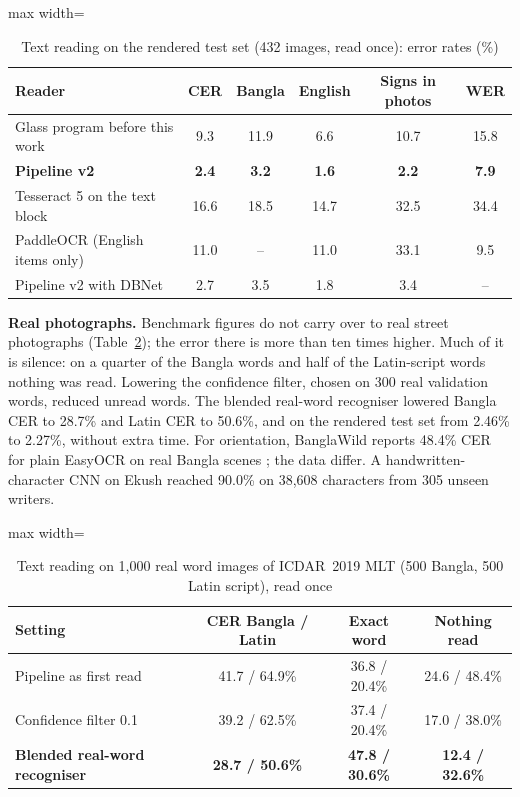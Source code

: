 \documentclass[preprint,12pt]{elsarticle}
\begin{document}
\begin{table}[!htbp]
\caption{Text reading on the rendered test set (432 images, read once): error rates (\%)}
\label{tab:ocr}
\centering\small
\begin{adjustbox}{max width=\textwidth}\begin{tabular}{@{}lccccc@{}}
\toprule
Reader & CER & Bangla & English & Signs in photos & WER \\ \midrule
Glass program before this work & 9.3 & 11.9 & 6.6 & 10.7 & 15.8 \\
\textbf{Pipeline v2} & \textbf{2.4} & \textbf{3.2} & \textbf{1.6} & \textbf{2.2} & \textbf{7.9} \\
Tesseract 5 on the text block & 16.6 & 18.5 & 14.7 & 32.5 & 34.4 \\
PaddleOCR (English items only) & 11.0 & -- & 11.0 & 33.1 & 9.5 \\
Pipeline v2 with DBNet & 2.7 & 3.5 & 1.8 & 3.4 & -- \\ \bottomrule
\end{tabular}\end{adjustbox}
\end{table}

\textbf{Real photographs.} Benchmark figures do not carry over to real street photographs (Table~\ref{tab:ocr_real}); the error there is more than ten times higher. Much of it is silence: on a quarter of the Bangla words and half of the Latin-script words nothing was read. Lowering the confidence filter, chosen on 300 real validation words, reduced unread words. The blended real-word recogniser lowered Bangla CER to 28.7\% and Latin CER to 50.6\%, and on the rendered test set from 2.46\% to 2.27\%, without extra time. For orientation, BanglaWild reports 48.4\% CER for plain EasyOCR on real Bangla scenes \cite{banglawild}; the data differ. A handwritten-character CNN on Ekush \cite{ekush} reached 90.0\% on 38,608 characters from 305 unseen writers.

\begin{table}[!htbp]
\caption{Text reading on 1,000 real word images of ICDAR~2019 MLT (500 Bangla, 500 Latin script), read once}
\label{tab:ocr_real}
\centering\small
\begin{adjustbox}{max width=\textwidth}\begin{tabular}{@{}lccc@{}}
\toprule
Setting & CER Bangla / Latin & Exact word & Nothing read \\ \midrule
Pipeline as first read & 41.7 / 64.9\% & 36.8 / 20.4\% & 24.6 / 48.4\% \\
Confidence filter 0.1 & 39.2 / 62.5\% & 37.4 / 20.4\% & 17.0 / 38.0\% \\
\textbf{Blended real-word recogniser} & \textbf{28.7 / 50.6\%} & \textbf{47.8 / 30.6\%} & \textbf{12.4 / 32.6\%} \\ \bottomrule
\end{tabular}\end{adjustbox}
\end{table}
\end{document}
